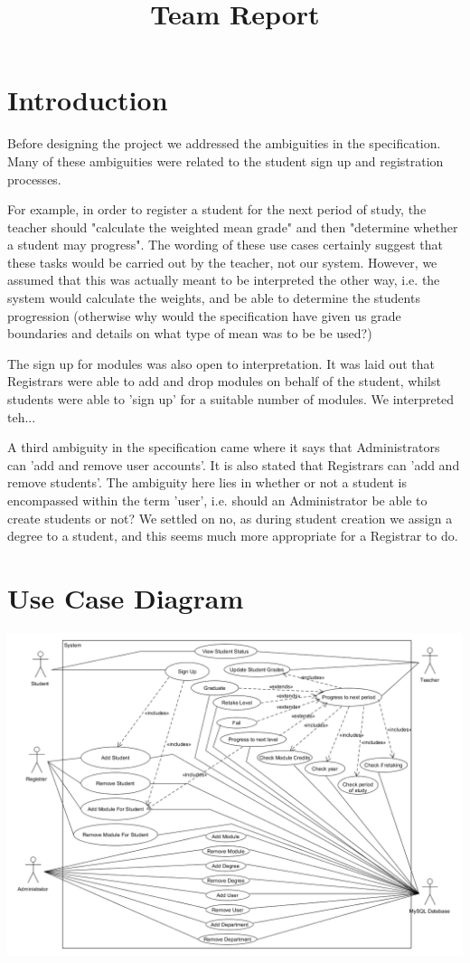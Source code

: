 \documentclass[12pt,a4paper]{article}
\title{Team Report}
\begin{document}
\maketitle

\section{Introduction}
Before designing the project we addressed the ambiguities in the specification.
Many of these ambiguities were related to the student sign up and registration
processes.

For example, in order to register a student for the next period of study, the
teacher  should "calculate the weighted mean grade" and then "determine
whether a student may progress". The wording of these use cases certainly suggest that
these tasks would be carried out by the teacher, not our system. However, we assumed
that this was actually meant to be interpreted the other way, i.e. the system
would calculate the weights, and be able to determine the students progression
(otherwise why would the specification have given us grade boundaries and details on what
type of mean was to be be used?)

The sign up for modules was also open to interpretation. It was laid out that
Registrars were able to add and drop modules on behalf of the student, whilst
students were able to 'sign up' for a suitable number of modules. We interpreted
teh...

A third ambiguity in the specification came where it says that Administrators can
'add and remove user accounts'. It is also stated that Registrars can 'add and remove
students'. The ambiguity here lies in whether or not a student is encompassed within
the term 'user', i.e. should an Administrator be able to create students or not? We
settled on no, as during student creation we assign a degree to a student, and this
seems much more appropriate for a Registrar to do.


\section{Use Case Diagram}

\centerline{\includegraphics[width=20cm]{useCaseDiagram}}
\end{document}

